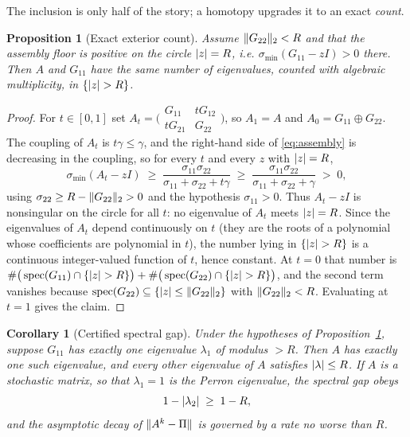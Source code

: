 \documentclass[11pt]{article}
\newtheorem{proposition}[theorem]{Proposition}
\newtheorem{corollary}[theorem]{Corollary}
\newcommand{\spec}{\operatorname{spec}}
\newcommand{\sig}{\sigma}
\newcommand{\sigmin}{\sigma_{\min}}
\DeclarePairedDelimiter{\norm}{\lVert}{\rVert}
\DeclarePairedDelimiter{\abs}{\lvert}{\rvert}
\begin{document}
The inclusion is only half of the story; a homotopy upgrades it to an exact \emph{count}.

\begin{proposition}[Exact exterior count]\label{prop:count}
Assume $\norm{G_{22}}_2<R$ and that the assembly floor is positive on the circle $\abs{z}=R$, i.e.
$\sigmin(G_{11}-zI)>0$ there. Then $A$ and $G_{11}$ have the \emph{same number} of eigenvalues, counted
with algebraic multiplicity, in $\{\abs{z}>R\}$.
\end{proposition}
\begin{proof}
For $t\in[0,1]$ set $A_t=\big(\begin{smallmatrix}G_{11}&tG_{12}\\ tG_{21}&G_{22}\end{smallmatrix}\big)$,
so $A_1=A$ and $A_0=G_{11}\oplus G_{22}$. The coupling of $A_t$ is $t\gamma\le\gamma$, and the
right-hand side of \eqref{eq:assembly} is decreasing in the coupling, so for every $t$ and every $z$
with $\abs{z}=R$,
\[
  \sigmin(A_t-zI)\;\ge\;\frac{\sig_{11}\sig_{22}}{\sig_{11}+\sig_{22}+t\gamma}
  \;\ge\;\frac{\sig_{11}\sig_{22}}{\sig_{11}+\sig_{22}+\gamma}\;>\;0,
\]
using $\sig_{22}\ge R-\norm{G_{22}}_2>0$ and the hypothesis $\sig_{11}>0$. Thus $A_t-zI$ is
nonsingular on the circle for all $t$: no eigenvalue of $A_t$ meets $\abs{z}=R$. Since the eigenvalues
of $A_t$ depend continuously on $t$ (they are the roots of a polynomial whose coefficients are
polynomial in $t$), the number lying in $\{\abs{z}>R\}$ is a continuous integer-valued function of
$t$, hence constant. At $t=0$ that number is
$\#\big(\spec(G_{11})\cap\{\abs{z}>R\}\big)+\#\big(\spec(G_{22})\cap\{\abs{z}>R\}\big)$, and the second
term vanishes because $\spec(G_{22})\subseteq\{\abs{z}\le\norm{G_{22}}_2\}$ with $\norm{G_{22}}_2<R$.
Evaluating at $t=1$ gives the claim.
\end{proof}

\begin{corollary}[Certified spectral gap]\label{cor:gap}
Under the hypotheses of Proposition~\ref{prop:count}, suppose $G_{11}$ has exactly one eigenvalue
$\lambda_1$ of modulus $>R$. Then $A$ has exactly one such eigenvalue, and \emph{every} other
eigenvalue of $A$ satisfies $\abs{\lambda}\le R$. If $A$ is a stochastic matrix, so that
$\lambda_1=1$ is the Perron eigenvalue, the spectral gap obeys
\[
  1-\abs{\lambda_2}\;\ge\;1-R ,
\]
and the asymptotic decay of $\norm{A^k-\Pi}$ is governed by a rate no worse than $R$.
\end{corollary}
\end{document}
